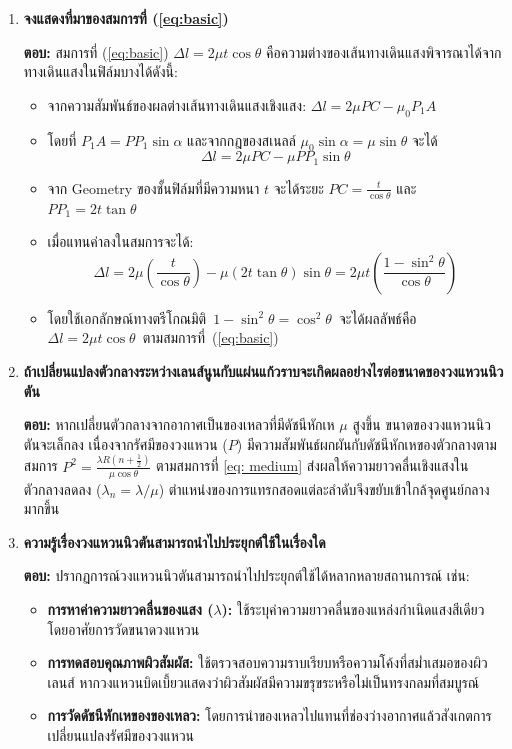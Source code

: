 \documentclass[11pt,a4paper]{article}
\begin{document}
\begin{enumerate}
    \item \textbf{จงแสดงที่มาของสมการที่ (\ref{eq:basic})} 
    
    \textbf{ตอบ:} สมการที่ (\ref{eq:basic}) $\Delta l = 2\mu t \cos\theta$ คือความต่างของเส้นทางเดินแสงพิจารณาได้จากทางเดินแสงในฟิล์มบางได้ดังนี้:
    \begin{itemize}
        \item จากความสัมพันธ์ของผลต่างเส้นทางเดินแสงเชิงแสง: $\Delta l = 2\mu PC - \mu_0 P_1A$
        \item โดยที่ $P_1A = PP_1 \sin\alpha$ และจากกฎของสเนลล์ $\mu_0 \sin\alpha = \mu \sin\theta$ จะได้ 
        \[\Delta l = 2\mu PC - \mu PP_1 \sin\theta\]
        \item จาก Geometry ของชั้นฟิล์มที่มีความหนา $t$ จะได้ระยะ $PC = \frac{t}{\cos\theta}$ และ $PP_1 = 2t \tan\theta$
        \item เมื่อแทนค่าลงในสมการจะได้:
        \[ \Delta l = 2\mu \left( \frac{t}{\cos\theta} \right) - \mu (2t \tan\theta) \sin\theta = 2\mu t \left( \frac{1 - \sin^2\theta}{\cos\theta} \right) \]
        \item \mbox{โดยใช้เอกลักษณ์ทางตรีโกณมิติ $1 - \sin^2\theta = \cos^2\theta$ จะได้ผลลัพธ์คือ $\Delta l = 2\mu t \cos\theta$ ตามสมการที่ (\ref{eq:basic})}
    \end{itemize}

    \item \textbf{ถ้าเปลี่ยนแปลงตัวกลางระหว่างเลนส์นูนกับแผ่นแก้วราบจะเกิดผลอย่างไรต่อขนาดของวงแหวนนิวตัน}
    
    \textbf{ตอบ:} หากเปลี่ยนตัวกลางจากอากาศเป็นของเหลวที่มีดัชนีหักเห $\mu$ สูงขึ้น ขนาดของวงแหวนนิวตันจะเล็กลง เนื่องจากรัศมีของวงแหวน ($P$) มีความสัมพันธ์ผกผันกับดัชนีหักเหของตัวกลางตามสมการ $P^2 = \frac{\lambda R (n+\frac{1}{2})}{\mu \cos\theta}$ ตามสมการที่ \ref{eq: medium} ส่งผลให้ความยาวคลื่นเชิงแสงในตัวกลางลดลง ($\lambda_n = \lambda / \mu$) ตำแหน่งของการแทรกสอดแต่ละลำดับจึงขยับเข้าใกล้จุดศูนย์กลางมากขึ้น

    \item \textbf{ความรู้เรื่องวงแหวนนิวตันสามารถนำไปประยุกต์ใช้ในเรื่องใด}
    
    \textbf{ตอบ:} ปรากฏการณ์วงแหวนนิวตันสามารถนำไปประยุกต์ใช้ได้หลากหลายสถานการณ์ เช่น:
    \begin{itemize}
        \item \textbf{การหาค่าความยาวคลื่นของแสง ($\lambda$):} ใช้ระบุค่าความยาวคลื่นของแหล่งกำเนิดแสงสีเดียวโดยอาศัยการวัดขนาดวงแหวน
        \item \textbf{การทดสอบคุณภาพผิวสัมผัส:} ใช้ตรวจสอบความราบเรียบหรือความโค้งที่สม่ำเสมอของผิวเลนส์ หากวงแหวนบิดเบี้ยวแสดงว่าผิวสัมผัสมีความขรุขระหรือไม่เป็นทรงกลมที่สมบูรณ์
        \item \textbf{การวัดดัชนีหักเหของของเหลว:} โดยการนำของเหลวไปแทนที่ช่องว่างอากาศแล้วสังเกตการเปลี่ยนแปลงรัศมีของวงแหวน
    \end{itemize}
\end{enumerate}
\end{document}
